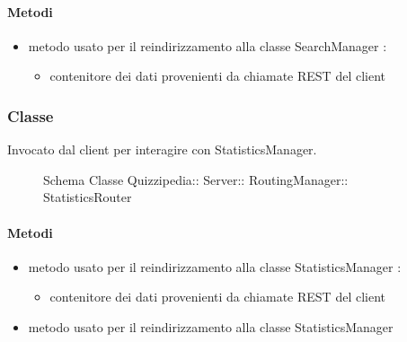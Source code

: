 \paragraph{Metodi}
\begin{itemize}
\item {}
\newline
metodo usato per il reindirizzamento alla classe SearchManager
\newline
{} :
\begin{itemize}
\item {}
\newline
contenitore dei dati provenienti da chiamate REST del client
\end{itemize}
\end{itemize}
\subsubsection{Classe }
Invocato dal client per interagire con StatisticsManager.
\begin{figure}[H]
\centering
\noindent{}
\caption[Schema Classe StatisticsRouter]{Schema Classe Quizzipedia:: Server:: RoutingManager:: StatisticsRouter}
\end{figure}
\paragraph{Metodi}
\begin{itemize}
\item {}
\newline
metodo usato per il reindirizzamento alla classe StatisticsManager
\newline
{} :
\begin{itemize}
\item {}
\newline
contenitore dei dati provenienti da chiamate REST del client
\end{itemize}
\item {}
\newline
metodo usato per il reindirizzamento alla classe StatisticsManager
\newline
\end{itemize}
